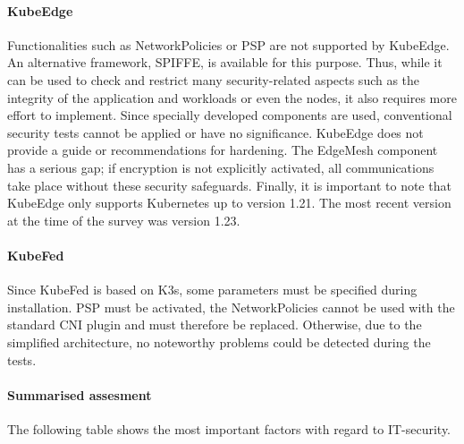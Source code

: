 \documentclass[MSC,Master,english]{twbook}%
\begin{document}
\paragraph{KubeEdge} Functionalities such as NetworkPolicies or \ac{PSP} are not supported by KubeEdge. An alternative framework, SPIFFE\cite{ke-secure-fw}, is available for this purpose. Thus, while it can be used to check and restrict many security-related aspects such as the integrity of the application and workloads or even the nodes, it also requires more effort to implement. Since specially developed components are used, conventional security tests cannot be applied or have no significance. KubeEdge does not provide a guide or recommendations for hardening. The EdgeMesh component has a serious gap; if encryption is not explicitly activated, all communications take place without these security safeguards. Finally, it is important to note that KubeEdge only supports Kubernetes up to version 1.21. The most recent version at the time of the survey was version 1.23.

\paragraph{KubeFed} Since KubeFed is based on K3s, some parameters must be specified during installation. \ac{PSP} must be activated, the NetworkPolicies cannot be used with the standard \ac{CNI} plugin and must therefore be replaced. Otherwise, due to the simplified architecture, no noteworthy problems could be detected during the tests.

\paragraph{Summarised assesment} The following table shows the most important factors with regard to IT-security.
\end{document}
